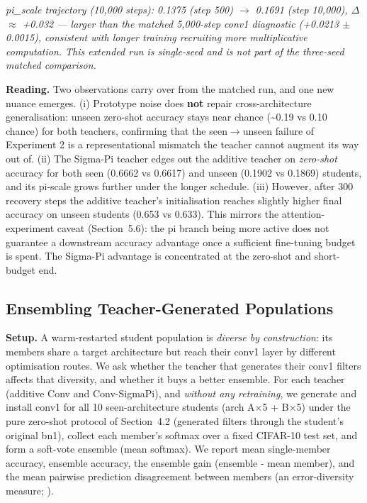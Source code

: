 \documentclass{article}
\begin{document}
\emph{pi\_scale trajectory (10,000 steps): 0.1375 (step 500) $\to$ 0.1691 (step 10,000), $\Delta$ $\approx$ +0.032 --- larger than the matched 5,000-step conv1 diagnostic (+0.0213 $\pm$ 0.0015), consistent with longer training recruiting more multiplicative computation. This extended run is single-seed and is not part of the three-seed matched comparison.}

\textbf{Reading.} Two observations carry over from the matched run, and one new nuance emerges. (i) Prototype noise does \textbf{not} repair cross-architecture generalisation: unseen zero-shot accuracy stays near chance (\textasciitilde0.19 vs 0.10 chance) for both teachers, confirming that the seen$\to$unseen failure of Experiment 2 is a representational mismatch the teacher cannot augment its way out of. (ii) The Sigma-Pi teacher edges out the additive teacher on \emph{zero-shot} accuracy for both seen (0.6662 vs 0.6617) and unseen (0.1902 vs 0.1869) students, and its pi-scale grows further under the longer schedule. (iii) However, after 300 recovery steps the additive teacher's initialisation reaches slightly higher final accuracy on unseen students (0.653 vs 0.633). This mirrors the attention-experiment caveat (Section~5.6): the pi branch being more active does not guarantee a downstream accuracy advantage once a sufficient fine-tuning budget is spent. The Sigma-Pi advantage is concentrated at the zero-shot and short-budget end.

\subsection{Ensembling Teacher-Generated Populations}\label{ensembling-teacher-generated-populations}

\textbf{Setup.} A warm-restarted student population is \emph{diverse by construction}: its members share a target architecture but reach their conv1 layer by different optimisation routes. We ask whether the teacher that generates their conv1 filters affects that diversity, and whether it buys a better ensemble. For each teacher (additive Conv and Conv-SigmaPi), and \emph{without any retraining}, we generate and install conv1 for all 10 seen-architecture students (arch A$\times$5 + B$\times$5) under the pure zero-shot protocol of Section~4.2 (generated filters through the student's original bn1), collect each member's softmax over a fixed CIFAR-10 test set, and form a soft-vote ensemble (mean softmax). We report mean single-member accuracy, ensemble accuracy, the ensemble gain (ensemble - mean member), and the mean pairwise prediction disagreement between members (an error-diversity measure; \citealp{kuncheva2003diversity}).
\end{document}
